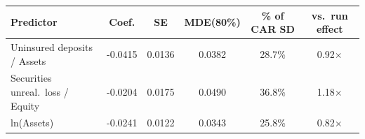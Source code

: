 \begin{tabular}{lccccc}
\toprule
Predictor & Coef. & SE & MDE(80\%) & \% of CAR SD & vs.\ run effect \\
\midrule
Uninsured deposits / Assets & -0.0415 & 0.0136 & 0.0382 & 28.7\% & 0.92$\times$ \\
Securities unreal.\ loss / Equity & -0.0204 & 0.0175 & 0.0490 & 36.8\% & 1.18$\times$ \\
ln(Assets) & -0.0241 & 0.0122 & 0.0343 & 25.8\% & 0.82$\times$ \\
\bottomrule
\end{tabular}